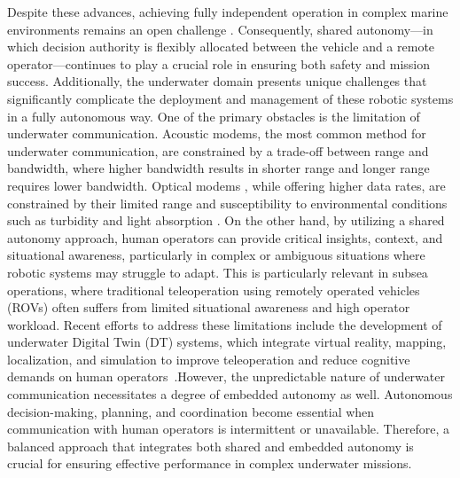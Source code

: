 \documentclass[journal]{IEEEtran}
\begin{document}
Despite these advances, achieving fully independent operation in complex marine environments remains an open challenge \cite{atyabi2018current}. Consequently, shared autonomy—in which decision authority is flexibly allocated between the vehicle and a remote operator—continues to play a crucial role in ensuring both safety and mission success. %
Additionally, the underwater domain presents unique challenges that significantly complicate the deployment and management of these robotic systems in a fully autonomous way. One of the primary obstacles is the limitation of underwater communication. Acoustic modems, the most common method for underwater communication, are constrained by a trade-off between range and bandwidth, where higher bandwidth results in shorter range and longer range requires lower bandwidth. Optical modems \cite{10244690}, while offering higher data rates, are constrained by their limited range and susceptibility to environmental conditions such as turbidity and light absorption \cite{grimaldi2023investigation}. 
On the other hand, by utilizing a shared autonomy approach, human operators can provide critical insights, context, and situational awareness, particularly in complex or ambiguous situations where robotic systems may struggle to adapt. This is particularly relevant in subsea operations, where traditional teleoperation using remotely operated vehicles (ROVs) often suffers from limited situational awareness and high operator workload. Recent efforts to address these limitations include the development of underwater Digital Twin (DT) systems, which integrate virtual reality, mapping, localization, and simulation to improve teleoperation and reduce cognitive demands on human operators~\cite{favor}.However, the unpredictable nature of underwater communication necessitates a degree of embedded autonomy as well. Autonomous decision-making, planning, and coordination become essential when communication with human operators is intermittent or unavailable. Therefore, a balanced approach that integrates both shared and embedded autonomy is crucial for ensuring effective performance in complex underwater missions.
\end{document}
